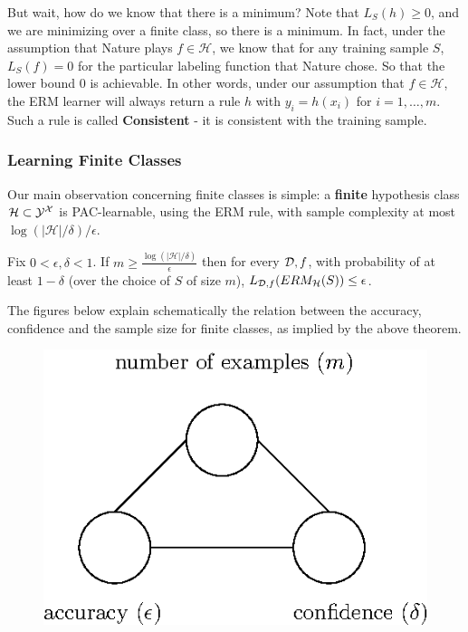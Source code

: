 \documentclass[11pt]{article}
\newcommand{\Hc}{\mathcal{H}}
\begin{document}
But wait, how do we know that there is a minimum?  Note that $L_S(h)\geq 0$, and we are minimizing over a finite class, so there is a minimum. In fact, under the assumption that Nature plays $f\in\Hc$, we know that for any training sample $S$,  $L_S(f) = 0$ for the particular labeling function that Nature chose. So that the lower bound $0$ is achievable. In other words, under our assumption that $f\in\Hc$, the ERM learner will always return a rule  $h$ with $y_i = h(x_i)$ for $i=1,\ldots,m$. 
Such a rule is called \textbf{Consistent} - it is consistent with the training sample. 


\subsubsection{Learning Finite Classes}

Our main observation concerning finite classes is simple: a {\bf finite} hypothesis
class $\Hc\subset\Y^\X$ is PAC-learnable, using the ERM rule,
with sample complexity at most 
$\log(|\Hc|/\delta)/\epsilon$.

\begin{theorem}
Fix $0< \epsilon,\delta <1$. If $m \ge \frac{\log(|\Hc|/\delta)}{\epsilon}$ then for every $\mathcal{D},f$, with probability of at least $1-\delta$ (over the choice of $S$ of size $m$), $L_{\D,f}(ERM_\Hc(S)) \le \epsilon$.
\end{theorem}

The figures below explain schematically the relation between the accuracy, confidence and the sample size for finite classes, as implied by the above theorem.

 \begin{figure}[h!]
 \centering\includegraphics[scale=0.8]{connection_m_eps_delta.eps}
 \end{figure}
\end{document}
